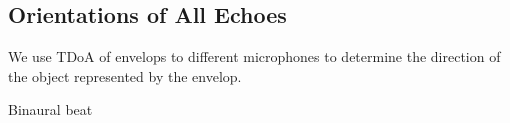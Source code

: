 


\subsection{Orientations of All Echoes}

We use TDoA of envelops to different microphones to determine the direction 
of the object represented by the envelop.


Binaural beat

